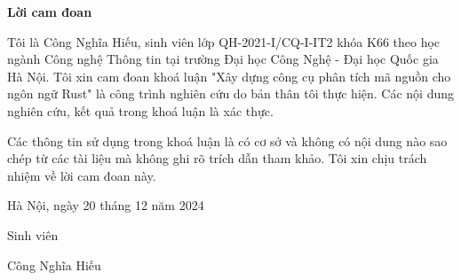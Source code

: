 \setcounter{page}{1}
\begin{center}
\textbf{\large{Lời cam đoan}	}
\end{center}

Tôi là Công Nghĩa Hiếu, sinh viên lớp QH-2021-I/CQ-I-IT2 khóa K66 theo học ngành Công nghệ Thông tin tại trường Đại học Công Nghệ - Đại học Quốc gia Hà Nội.
Tôi xin cam đoan khoá luận "Xây dựng công cụ phân tích mã nguồn cho ngôn ngữ Rust" là công trình nghiên cứu do bản thân tôi thực hiện.
Các nội dung nghiên cứu, kết quả trong khoá luận là xác thực.

Các thông tin sử dụng trong khoá luận là có cơ sở và không có nội dung nào sao chép từ các tài liệu mà không ghi rõ trích dẫn tham khảo.
Tôi xin chịu trách nhiệm về lời cam đoan này.

\begin{flushright}
Hà Nội, ngày 20 tháng 12 năm 2024
\end{flushright}

\begin{changemargin}{11.5cm}{2cm}
Sinh viên
\\[2cm]
\end{changemargin}

\begin{changemargin}{11cm}{2cm}
Công Nghĩa Hiếu
\end{changemargin}
